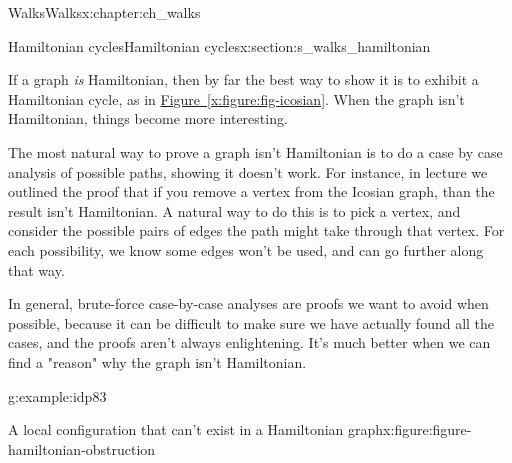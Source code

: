 \documentclass[oneside,10pt,]{book}
\newcommand{\xreffont}{\relax}
\numberwithin{equation}{section}
\begin{document}
\begin{chapterptx}{Walks}{}{Walks}{}{}{x:chapter:ch_walks}
\begin{sectionptx}{Hamiltonian cycles}{}{Hamiltonian cycles}{}{}{x:section:s_walks_hamiltonian}
\par
If a graph \emph{is} Hamiltonian, then by far the best way to show it is to exhibit a Hamiltonian cycle, as in \hyperref[x:figure:fig-icosian]{Figure~{\xreffont\ref{x:figure:fig-icosian}}}.  When the graph isn't Hamiltonian, things become more interesting.%
\par
The most natural way to prove a graph isn't Hamiltonian is to do a case by case analysis of possible paths, showing it doesn't work.  For instance, in lecture we outlined the proof that if you remove a vertex from the Icosian graph, than the result isn't Hamiltonian.  A natural way to do this is to pick a vertex, and consider the possible pairs of edges the path might take through that vertex.  For each possibility, we know some edges won't be used, and can go further along that way.%
\par
In general, brute-force case-by-case analyses are proofs we want to avoid when possible, because it can be difficult to make sure we have actually found all the cases, and the proofs aren't always enlightening.  It's much better when we can find a "reason" why the graph isn't Hamiltonian.%
\begin{example}{}{g:example:idp83}%
\begin{figureptx}{A local configuration that can't exist in a Hamiltonian graph}{x:figure:figure-hamiltonian-obstruction}{}%
\begin{image}{0.15}{0.7}{0.15}%
\end{image}
\end{figureptx}
\end{example}
\end{sectionptx}
\end{chapterptx}
\end{document}

